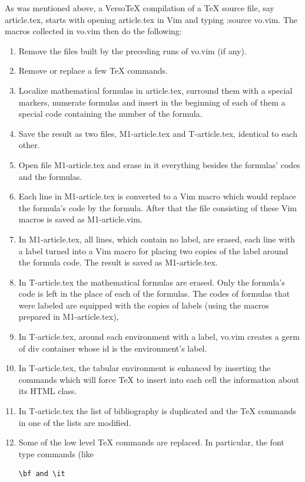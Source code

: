\documentclass{article}
\begin{document}
As was mentioned above, a VersoTeX compilation of a TeX source file, say 
article.tex, starts with opening article.tex in Vim and typing\newline   
:source vo.vim.
The macros collected in vo.vim then do the following:
\begin{enumerate} 
\item Remove the files built by the preceding runs of vo.vim (if any).
\item Remove or replace a few TeX commands.
\item Localize mathematical formulas in article.tex, surround them with
a special markers, numerate formulas and insert in the beginning of 
each of them a special code containing the number of the formula.
\item Save the result as two files, M1-article.tex and T-article.tex,
identical to each other.
\item Open file M1-article.tex and erase in it everything besides the
formulas' codes and the formulas.
\item Each line in M1-article.tex is converted to a Vim macro which 
would replace the formula's code by the formula. After that the
file consisting of these Vim macros is saved as M1-article.vim.
\item In M1-article.tex, all lines, which contain no label, are erased, 
each line with a label turned into a Vim macro for placing two copies 
of the label around the formula code. The result is saved as M1-article.tex.
\item In T-article.tex the mathematical formulas are erased. Only the
formula's code is left in the place of each of the formulas. The codes of
formulas that were labeled are equipped with the copies of labels (using
the macros prepared in M1-article.tex),
\item In T-article.tex, around each environment with a label, vo.vim creates 
a germ of div container whose id is the environment's label.
\item In T-article.tex, the tabular environment is enhanced by inserting 
the commands which will force TeX to insert into each cell the information 
about its HTML class.
\item In T-article.tex the list of bibliography is duplicated and the TeX
commands in one of the lists are modified.
\item Some of the low level TeX commands are replaced. In particular, the
font type commands (like \begin{verbatim}\bf and \it\end{verbatim} 

\end{enumerate}
\end{document}
